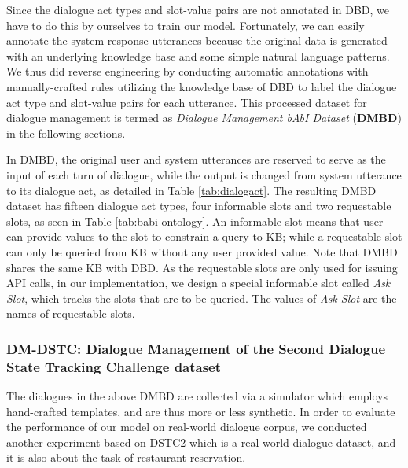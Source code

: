 Since the dialogue act types and slot-value pairs are not annotated in DBD, we have to do this by ourselves to train our model. Fortunately, we can easily annotate the system response utterances because the original data is generated with an underlying knowledge base and some simple natural language patterns. We thus did reverse engineering by conducting automatic annotations with manually-crafted rules utilizing the knowledge base of DBD to label the dialogue act type and slot-value pairs for each utterance. This processed dataset for dialogue management is termed as {\it Dialogue Management bAbI Dataset} ({\bf DMBD}) in the following sections.


In DMBD, the original user and system utterances are reserved to serve as the input of each turn of dialogue, while the output is changed from system utterance to its dialogue act, as detailed in Table \ref{tab:dialogact}. The resulting DMBD dataset has fifteen dialogue act types, four informable slots and two requestable slots, as seen in Table \ref{tab:babi-ontology}.
An informable slot means that user can provide values to the slot to constrain a query to KB; while a requestable slot can only be queried from KB without any user provided value. Note that DMBD shares the same KB with DBD. As the requestable slots are only used for issuing API calls, in our implementation, we design a special informable slot called {\em Ask Slot}, which tracks the slots that are to be queried. The values of {\em Ask Slot} are the names of requestable slots.



\subsubsection{DM-DSTC: Dialogue Management of the Second Dialogue State Tracking Challenge dataset}
The dialogues in the above DMBD are collected via a simulator which employs hand-crafted templates, and are thus more or less synthetic. In order to evaluate the performance of our model on real-world dialogue corpus, we conducted another experiment based on DSTC2 which is a real world dialogue dataset, and it is also about the task of restaurant reservation.

